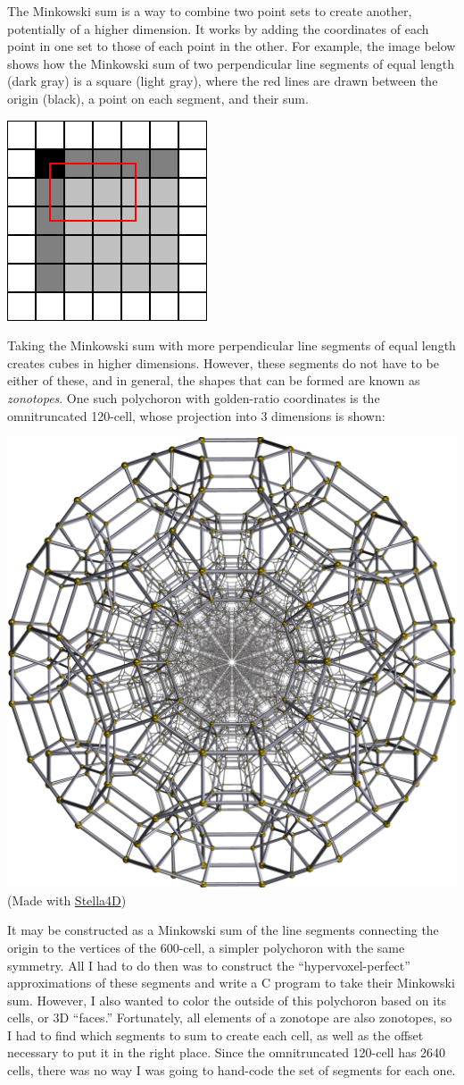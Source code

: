 \documentclass{article}
\begin{document}
The Minkowski sum is a way to combine two point sets to create another,
potentially of a higher dimension.
It works by adding the coordinates of each point in one set
to those of each point in the other.
For example, the image below shows how
the Minkowski sum of two perpendicular line segments of equal length (dark gray)
is a square (light gray),
where the red lines are drawn between the origin (black),
a point on each segment, and their sum.
\begin{center}
\includegraphics[width=0.25\linewidth]{mink.png}
\end{center}
Taking the Minkowski sum with more perpendicular line segments of equal length
creates cubes in higher dimensions.
However, these segments do not have to be either of these,
and in general, the shapes that can be formed are known as \textit{zonotopes}.
One such polychoron with golden-ratio coordinates is the omnitruncated 120-cell,
whose projection into 3 dimensions is shown:
\begin{center}
\includegraphics[width=0.5\linewidth]{gidpixhi.png}\\
(Made with \href{http://www.software3d.com/Stella.php}{Stella4D})
\end{center}
It may be constructed as a Minkowski sum of the line segments
connecting the origin to the vertices of the 600-cell,
a simpler polychoron with the same symmetry.
All I had to do then was to construct the ``hypervoxel-perfect'' approximations of these segments
and write a C program to take their Minkowski sum.
However, I also wanted to color the outside of this polychoron
based on its cells, or 3D ``faces.''
Fortunately, all elements of a zonotope are also zonotopes,
so I had to find which segments to sum to create each cell,
as well as the offset necessary to put it in the right place.
Since the omnitruncated 120-cell has 2640 cells,
there was no way I was going to hand-code the set of segments for each one.
\end{document}

